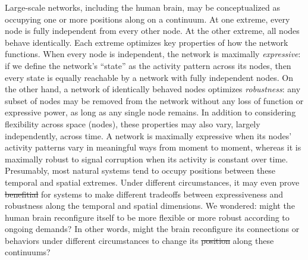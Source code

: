 \documentclass[english, 11pt]{article}
\providecommand{\DIFaddtex}[1]{{\protect\color{blue}\uwave{#1}}} %
\providecommand{\DIFdeltex}[1]{{\protect\color{red}\sout{#1}}}                      %
\providecommand{\DIFaddbegin}{} %
\providecommand{\DIFaddend}{} %
\providecommand{\DIFdelbegin}{} %
\providecommand{\DIFdelend}{} %
\providecommand{\DIFadd}[1]{\texorpdfstring{\DIFaddtex{#1}}{#1}} %
\providecommand{\DIFdel}[1]{\texorpdfstring{\DIFdeltex{#1}}{}} %
\newcommand{\DIFscaledelfig}{0.5}
\newlength{\DIFdelgraphicswidth} %
\newlength{\DIFdelgraphicsheight} %
\newcommand{\DIFaddincludegraphics}[2][]{{\color{blue}\fbox{\DIFOincludegraphics[#1]{#2}}}} %
\newcommand{\DIFdelincludegraphics}[2][]{%
\sbox{\DIFdelgraphicsbox}{\DIFOincludegraphics[#1]{#2}}%
\settoboxwidth{\DIFdelgraphicswidth}{\DIFdelgraphicsbox} %
\settoboxtotalheight{\DIFdelgraphicsheight}{\DIFdelgraphicsbox} %
\scalebox{\DIFscaledelfig}{%
\parbox[b]{\DIFdelgraphicswidth}{\usebox{\DIFdelgraphicsbox}\\[-\baselineskip] \rule{\DIFdelgraphicswidth}{0em}}\llap{\resizebox{\DIFdelgraphicswidth}{\DIFdelgraphicsheight}{%
\setlength{\unitlength}{\DIFdelgraphicswidth}%
\begin{picture}(1,1)%
\thicklines\linethickness{2pt} %
{\color[rgb]{1,0,0}\put(0,0){\framebox(1,1){}}}%
{\color[rgb]{1,0,0}\put(0,0){\line( 1,1){1}}}%
{\color[rgb]{1,0,0}\put(0,1){\line(1,-1){1}}}%
\end{picture}%
}\hspace*{3pt}}} %
} %
\DeclareRobustCommand{\DIFaddbegin}{\DIFOaddbegin \let\includegraphics\DIFaddincludegraphics} %
\DeclareRobustCommand{\DIFaddend}{\DIFOaddend \let\includegraphics\DIFOincludegraphics} %
\DeclareRobustCommand{\DIFdelbegin}{\DIFOdelbegin \let\includegraphics\DIFdelincludegraphics} %
\DeclareRobustCommand{\DIFdelend}{\DIFOaddend \let\includegraphics\DIFOincludegraphics} %
\begin{document}
Large-scale networks, including the human brain, may be conceptualized as
occupying one or more positions along on a continuum. At one extreme, every
node is fully independent from every other node. At the other extreme, all
nodes behave identically. Each extreme optimizes key properties of how the
network functions. When every node is independent, the network is maximally
\textit{expressive}: if we define the network's ``state'' as the activity
pattern across its nodes, then every state is equally reachable by a network
with fully independent nodes. On the other hand, a network of identically
behaved nodes optimizes \textit{robustness}: any subset of nodes may be removed
from the network without any loss of function or expressive power, as long as
any single node remains. In addition to considering flexibility across space
(nodes), these properties may also vary, largely independently, across time. A
network is maximally expressive when its nodes' activity patterns vary in
meaningful ways from moment to moment, whereas it is maximally robust to signal
corruption when its activity is constant over time. Presumably, most natural
systems tend to occupy positions between these temporal and spatial extremes. Under
different circumstances, it may even prove \DIFdelbegin \DIFdel{benefitial }\DIFdelend \DIFaddbegin \DIFadd{beneficial }\DIFaddend for systems to make
different tradeoffs between expressiveness and robustness along the temporal
and spatial dimensions.  We wondered: might the human brain reconfigure itself to
be more flexible or more robust according to ongoing demands? In other words,
might the brain reconfigure its connections or behaviors under different
circumstances to change its \DIFdelbegin \DIFdel{position }\DIFdelend \DIFaddbegin \DIFadd{positions }\DIFaddend along these continuums?
\end{document}
